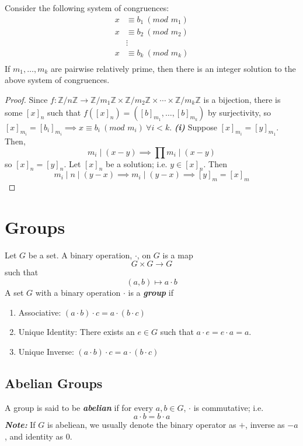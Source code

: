 \documentclass{report}
\newcommand{\Z}{\mathbb{Z}}
\newcommand{\modclass}[1]{\Z/{#1}\Z}
\newcommand{\textib}[1]{\textit{\textbf{{#1}}}}
\newcommand{\theorem}[1]{\begin{tcolorbox}[title=\textit{Theorem}]{#1}\end{tcolorbox}}
\renewcommand{\mod}[1]{\ (\textit{mod } {#1})}
\begin{document}
\theorem{
    Consider the following system of congruences:
    \begin{align*}
        x &\equiv b_1 \mod{m_1} \\
        x &\equiv b_2 \mod{m_2} \\
          &\vdots \\
        x &\equiv b_k \mod{m_k} \\
    \end{align*}
    If $m_1, \ldots, m_k$ are pairwise relatively prime, then there is an integer solution to the 
    above system of congruences.
}
\begin{proof}
    Since $f : \modclass{n} \to \modclass{m_1} \times \modclass{m_2} \times \cdots \times \modclass{m_k}$
    is a bijection, there is some $[x]_n$ such that $f([x]_n) = ([b]_{m_1}, \ldots, [b]_{m_k})$ by surjectivity,
    so $[x]_{m_i} = [b_i]_{m_i} \implies x \equiv b_i \mod{m_i} \ \forall i < k$. \textib{(i)}  
    \newline
    \newline
    Suppose $[x]_{m_i} = [y]_{m_1}$. Then, 
    \[m_i \mid (x - y) \implies \prod m_i \mid (x - y)\]
    so $[x]_n = [y]_n$. Let $[x]_n$ be a solution; i.e. $y \in [x]_n$. Then
    \[m_i \mid n \mid (y - x) \implies m_i \mid (y - x) \implies [y]_m = [x]_m\]
\end{proof}





\section{Groups}
Let $G$ be a set. A binary operation, $\cdot$, on $G$ is a map 
\[G \times G \to G\] such that
\[(a, b) \mapsto a \cdot b\]
A set $G$ with a binary operation $\cdot$ is a \textib{group} if
\begin{enumerate}[label=\textit{(\roman*)}]
    \item Associative: $(a \cdot b) \cdot c = a \cdot (b \cdot c)$
    \item Unique Identity: There exists an $e \in G$ such that $a \cdot e = e \cdot a = a$.
    \item Unique Inverse: $(a \cdot b) \cdot c = a \cdot (b \cdot c)$
\end{enumerate}

\subsection{Abelian Groups}
A group is said to be \textib{abelian} if for every $a, b \in G$, $\cdot$ is commutative; i.e.
\[a \cdot b = b \cdot a\]
\textib{Note:} If $G$ is abeliean, we usually denote the binary operator as $+$, inverse as $-a$, and
identity as $0$.
\end{document}
